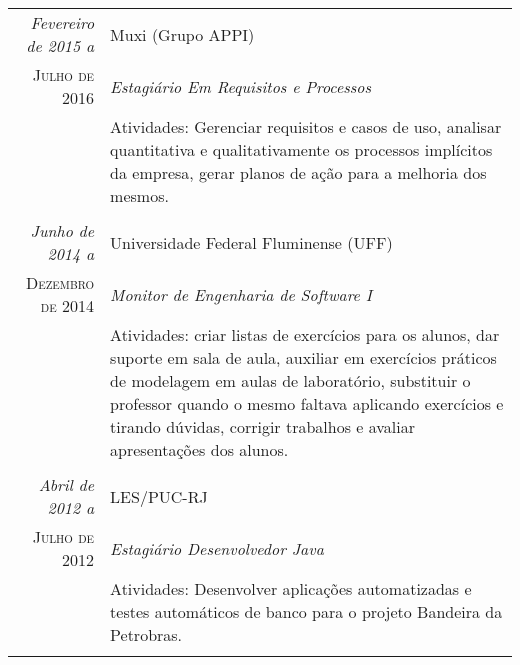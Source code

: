 \documentclass[a4paper,10pt]{article}
\begin{document}
\begin{tabular}{r|p{10cm}}
 \emph{Fevereiro de 2015 a} & Muxi (Grupo APPI) \\
 \textsc{Julho de 2016}&\emph{Estagiário Em Requisitos e Processos}\\
 &\footnotesize{Atividades: Gerenciar requisitos e casos de uso, analisar quantitativa e qualitativamente os processos implícitos da empresa, gerar planos de ação para a melhoria dos mesmos.}\\
 
 & \\
 
 \emph{Junho de 2014 a} & Universidade Federal Fluminense (UFF) \\
 \textsc{Dezembro de 2014}&\emph{Monitor de Engenharia de Software I}\\
 &\footnotesize{Atividades: criar listas de exercícios para os alunos, dar suporte em sala de aula, auxiliar em exercícios práticos de modelagem em aulas de laboratório, substituir o professor quando o mesmo faltava aplicando exercícios e tirando dúvidas, corrigir trabalhos e avaliar apresentações dos alunos.}\\
 
  & \\
 
 \emph{Abril de 2012 a} & LES/PUC-RJ \\
 \textsc{Julho de 2012}&\emph{Estagiário Desenvolvedor Java}\\
 &\footnotesize{Atividades: Desenvolver aplicações automatizadas e testes automáticos de banco para o projeto Bandeira da Petrobras.}\\
 
 \multicolumn{2}{c}{} \end{tabular}
 
\end{document}
